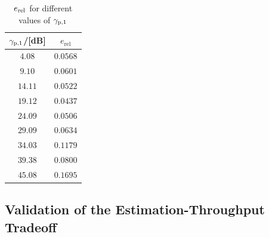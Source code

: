 \begin{table}
        \renewcommand{\arraystretch}{1.4}
	\centering
	\caption{$e_{\text{rel}}$ for different values of ${\gamma}_{\text{p,1}}$}
	\label{nichtzentral}
	\begin{tabular}{c||c} 
		\bfseries ${\gamma}_{\text{p,1}}$/[dB] &  \bfseries $e_\textrm{rel}$ \\ \hline \hline
		$4.08$ &  $0.0568$ \\
		$9.10$ &  $0.0601$ \\
		$14.11$ & $0.0522$ \\
		$19.12$ & $0.0437$ \\
		$24.09$ & $0.0506$ \\
		$29.09$ & $0.0634$ \\
		$34.03$ & $0.1179$ \\
		$39.38$ & $0.0800$ \\
		$45.08$ & $0.1695$ \\ \hline
	\end{tabular}
\end{table}


\subsection{Validation of the Estimation-Throughput Tradeoff}

